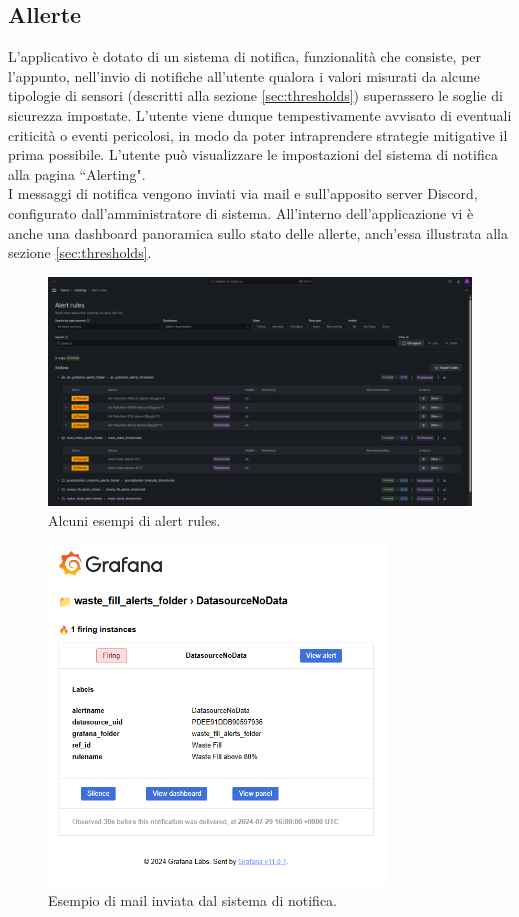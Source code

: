 \documentclass[8pt]{article}
\begin{document}
\subsection{Allerte} \label{sec:alert}
L'applicativo è dotato di un sistema di notifica, funzionalità che consiste, per l'appunto, nell'invio di notifiche all'utente qualora i valori misurati da alcune tipologie di sensori (descritti alla sezione \ref{sec:thresholds}) superassero le soglie di sicurezza impostate. L'utente viene dunque tempestivamente avvisato di eventuali criticità o eventi pericolosi, in modo da poter intraprendere strategie mitigative il prima possibile. L'utente può visualizzare le impostazioni del sistema di notifica alla pagina ``Alerting". \\ I messaggi di notifica vengono inviati via mail e sull'apposito server Discord, configurato dall'amministratore di sistema. All'interno dell'applicazione vi è anche una dashboard panoramica sullo stato delle allerte, anch'essa illustrata alla sezione \ref{sec:thresholds}.
\begin{figure}[H]
    \centering
    \includegraphics[width=15cm]{images_mu/alerting.png}
    \caption{Alcuni esempi di alert rules.}
    \label{fig:Alcuni esempi di alert rules}
\end{figure}
\begin{figure}[H]
    \centering
    \includegraphics[width=9cm]{images_mu/mail.png}
    \caption{Esempio di mail inviata dal sistema di notifica.}
    \label{fig:Esempio di mail inviata dal sistema di notifica}
\end{figure}
\end{document}
